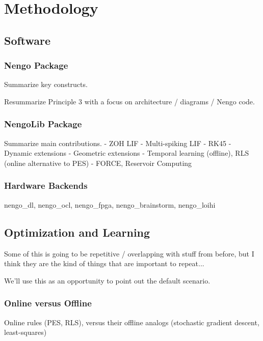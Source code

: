 \chapter{Methodology}
\label{chapt:methodology}


\section{Software}

\subsection{Nengo Package}

Summarize key constructs.

Resummarize Principle 3 with a focus on architecture / diagrams / Nengo code.

\subsection{NengoLib Package}

Summarize main contributions.
 - ZOH LIF
 - Multi-spiking LIF
 - RK45
 - Dynamic extensions
 - Geometric extensions
 - Temporal learning (offline), RLS (online alternative to PES)
 - FORCE, Reservoir Computing

\subsection{Hardware Backends}

nengo\_dl, nengo\_ocl, nengo\_fpga, nengo\_brainstorm, nengo\_loihi


\section{Optimization and Learning}

Some of this is going to be repetitive / overlapping with stuff from before, but I think they are the kind of things that are important to repeat...

We'll use this as an opportunity to point out the default scenario.

\subsection{Online versus Offline}

Online rules (PES, RLS), versus their offline analogs (stochastic gradient descent, least-squares)

